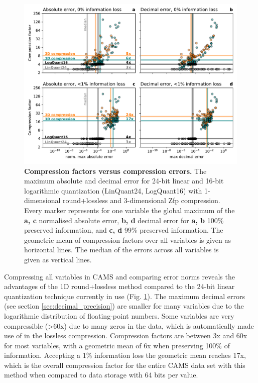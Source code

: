 \begin{figure}[tbhp]
	\includegraphics[width=1\textwidth]{Figures/compression/compression_error.pdf}
	\caption{\textbf{Compression factors versus compression errors.} The maximum absolute and decimal error
	for 24-bit linear and 16-bit logarithmic quantization (LinQuant24, LogQuant16) with 1-dimensional round+lossless
	and 3-dimensional Zfp compression. Every marker represents for one variable the global maximum of the \textbf{a, c}
	normalised absolute error, \textbf{b, d} decimal error for \textbf{a, b} 100\% preserved information, and \textbf{c, d}
	 99\% preserved information. The geometric mean of compression factors over all variables is given as horizontal lines.
	 The median of the errors across all variables is given as vertical lines.}
	\label{fig:compression_error}
\end{figure}

Compressing all variables in CAMS and comparing error norms reveals the advantages of the 1D round+lossless method
compared to the 24-bit linear quantization technique currently in use (Fig. \ref{fig:compression_error}). The maximum decimal
errors (see section \ref{sec:decimal_precision}) are smaller for many variables due to the logarithmic distribution of floating-point numbers.
Some variables are very compressible (>60x) due to many zeros in the data, which is automatically made use of in the lossless compression.
Compression factors are between 3x and 60x for most variables, with a geometric mean of 6x when preserving 100\% of information.
Accepting a 1\% information loss the geometric mean reaches 17x, which is the overall compression factor for the entire CAMS data
set with this method when compared to data storage with 64 bits per value.

